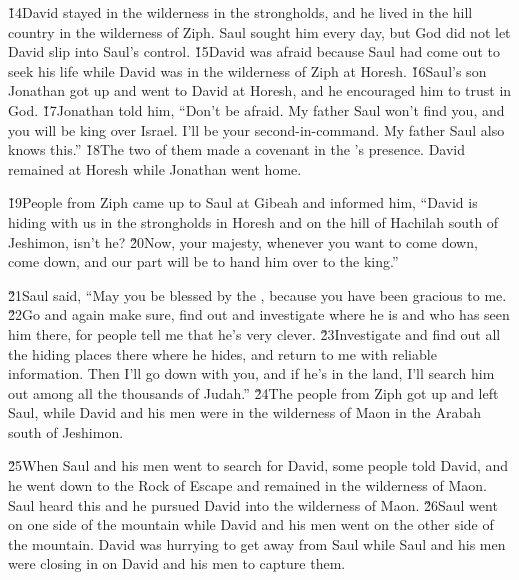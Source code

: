 \v{14}David stayed in the wilderness in the strongholds, and he lived in the hill country in the wilderness of Ziph. Saul sought him every day, but God did not let David slip into Saul's control. \v{15}David was afraid because Saul had come out to seek his life while David was in the wilderness of Ziph at Horesh. \v{16}Saul's son Jonathan got up and went to David at Horesh, and he encouraged him to trust in God. \v{17}Jonathan told him, ``Don't be afraid. My father Saul won't find you, and you will be king over Israel. I'll be your second-in-command. My father Saul also knows this.'' \v{18}The two of them made a covenant in the 's presence. David remained at Horesh while Jonathan went home.

\v{19}People from Ziph came up to Saul at Gibeah and informed him, ``David is hiding with us in the strongholds in Horesh and on the hill of Hachilah south of Jeshimon, isn't he? \v{20}Now, your majesty, whenever you want to come down, come down, and our part will be to hand him over to the king.''

\v{21}Saul said, ``May you be blessed by the , because you have been gracious to me. \v{22}Go and again make sure, find out and investigate where he is and who has seen him there, for people tell me that he's very clever. \v{23}Investigate and find out all the hiding places there where he hides, and return to me with reliable information. Then I'll go down with you, and if he's in the land, I'll search him out among all the thousands of Judah.'' \v{24}The people from Ziph got up and left Saul, while David and his men were in the wilderness of Maon in the Arabah south of Jeshimon.

\v{25}When Saul and his men went to search for David, some people told David, and he went down to the Rock of Escape and remained in the wilderness of Maon. Saul heard this and he pursued David into the wilderness of Maon. \v{26}Saul went on one side of the mountain while David and his men went on the other side of the mountain. David was hurrying to get away from Saul while Saul and his men were closing in on David and his men to capture them.

